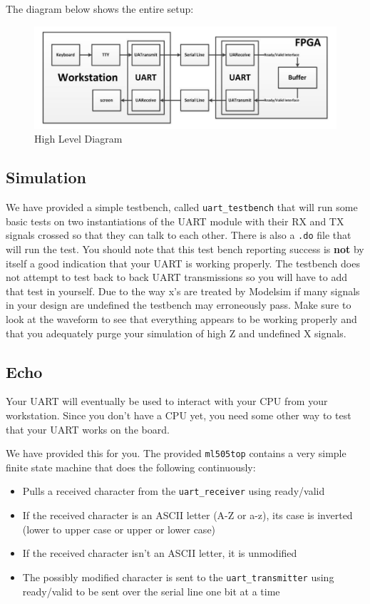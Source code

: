 \documentclass[11pt]{article}
\begin{document}
The diagram below shows the entire setup:
\begin{figure}[H]
	\centerline{\includegraphics[width=6in]{images/high_level_diagram.png}}
	\caption{High Level Diagram}
\end{figure}

\subsection{Simulation}
We have provided a simple testbench, called \verb|uart_testbench| that will run some basic tests on two instantiations of the UART module with their RX and TX signals crossed so that they can talk to each other. There is also a \verb|.do| file that will run the test. You should note that this test bench reporting success is \textbf{not} by itself a good indication that your UART is working properly. The testbench does not attempt to test back to back UART transmissions so you will have to add that test in yourself. Due to the way x's are treated by Modelsim if many signals in your design are undefined the testbench may erroneously pass. Make sure to look at the waveform to see that everything appears to be working properly and that you adequately purge your simulation of high Z and undefined X signals.

\subsection{Echo}
Your UART will eventually be used to interact with your CPU from your workstation. Since you don't have a CPU yet, you need some other way to test that your UART works on the board.

We have provided this for you. The provided \verb|ml505top| contains a very simple finite state machine that does the following continuously:

\begin{itemize}
	\item Pulls a received character from the \verb|uart_receiver| using ready/valid
	\item If the received character is an ASCII letter (A-Z or a-z), its case is inverted (lower to upper case or upper or lower case)
	\item If the received character isn't an ASCII letter, it is unmodified
	\item The possibly modified character is sent to the \verb|uart_transmitter| using ready/valid to be sent over the serial line one bit at a time
\end{itemize}
\end{document}
